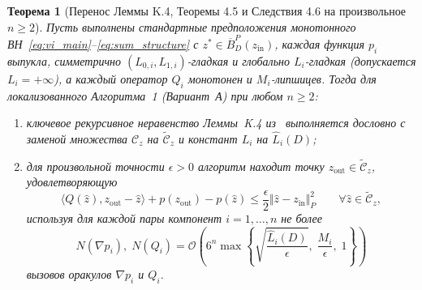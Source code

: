 \documentclass[11pt, a4paper]{article}
\newtheorem{theorem}{Теорема}[section]
\theoremstyle{definition}
\begin{document}
\begin{theorem}[Перенос Леммы K.4, Теоремы 4.5 и Следствия 4.6 на произвольное $n \ge 2$]\label{thm:variant_A}
Пусть выполнены стандартные предположения монотонного ВН~\eqref{eq:vi_main}--\eqref{eq:sum_structure} с $z^* \in \overline{B}_D^P(z_{\mathrm{in}})$, каждая функция $p_i$ выпукла, симметрично $(L_{0,i}, L_{1,i})$-гладкая и глобально $L_i$-гладкая (допускается $L_i = +\infty$), а каждый оператор $Q_i$ монотонен и $M_i$-липшицев. Тогда для локализованного Алгоритма~1 (Вариант~А) при любом $n \ge 2$:
\begin{enumerate}
    \item ключевое рекурсивное неравенство Леммы~K.4 из~\cite{Borodich2025} выполняется дословно с заменой множества $\mathcal{C}_z$ на $\widetilde{\mathcal{C}}_z$ и констант $L_i$ на $\widehat{L}_i(D)$;
    \item для произвольной точности $\epsilon > 0$ алгоритм находит точку $z_{\mathrm{out}} \in \widetilde{\mathcal{C}}_z$, удовлетворяющую
    \begin{equation}\label{eq:variant_A_gap}
    \langle Q(\hat{z}), z_{\mathrm{out}} - \hat{z} \rangle + p(z_{\mathrm{out}}) - p(\hat{z}) \le \frac{\epsilon}{2} \Vert \hat{z} - z_{\mathrm{in}} \Vert_P^2 \qquad \forall \hat{z} \in \widetilde{\mathcal{C}}_z,
    \end{equation}
    используя для каждой пары компонент $i = 1, \dots, n$ не более
    \begin{equation}\label{eq:variant_A_complexity}
    N(\nabla p_i),\; N(Q_i) = \mathcal{O}\!\left(6^n \max\left\{\sqrt{\frac{\widehat{L}_i(D)}{\epsilon}},\; \frac{M_i}{\epsilon},\; 1\right\}\right)
    \end{equation}
    вызовов оракулов $\nabla p_i$ и $Q_i$.
\end{enumerate}
\end{theorem}
\end{document}
